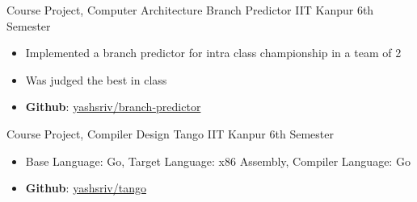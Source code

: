 \cventry
{Course Project, Computer Architecture}
{Branch Predictor}
{IIT Kanpur}
{6th Semester}
{
  \begin{itemize}
  \item Implemented a branch predictor for intra class championship in a team of 2
  \item Was judged the best in class
  \item \textbf{Github}:
    \href{http://github.com/yashsriv/branch-predictor}{yashsriv/branch-predictor} 
  \end{itemize}
}

\cventry
{Course Project, Compiler Design}
{Tango}
{IIT Kanpur}
{6th Semester}
{
  \begin{itemize}
  \item Base Language: Go, Target Language: x86 Assembly, Compiler Language: Go
  \item \textbf{Github}:
    \href{http://github.com/yashsriv/tango}{yashsriv/tango} 
  \end{itemize}
}
